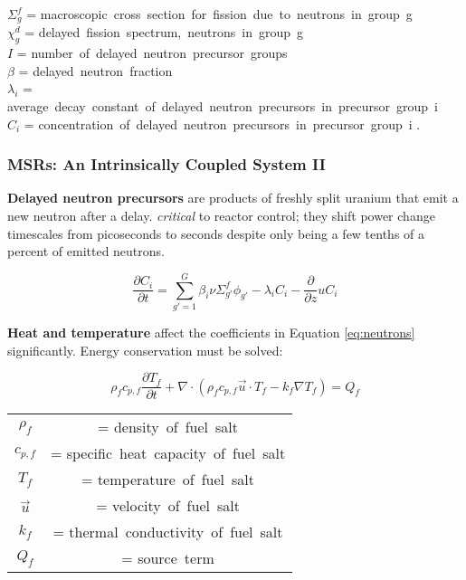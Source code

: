 \begin{frame}
				$\Sigma_g^f$ = \mbox{macroscopic cross section for fission due to neutrons in group g} \\
				$\chi_g^d$   = \mbox{delayed fission spectrum, neutrons in group g} \\
				$I $         = \mbox{number of delayed neutron precursor groups} \\
				$\beta $     = \mbox{delayed neutron fraction}\\
				$\lambda_i $ = \mbox{average decay constant of delayed neutron precursors
				in precursor group i} \\
				$C_i $       = \mbox{concentration of delayed neutron precursors in precursor
				group i} .
\end{frame}

\begin{frame}
    \frametitle{MSRs: An Intrinsically Coupled System II}
    \textbf{Delayed neutron precursors} are products of freshly split uranium that emit a new neutron after a delay.
    \textit{critical} to reactor control; they shift power change timescales from picoseconds to seconds despite
    only being a few tenths of a percent of emitted neutrons.

	\begin{equation}
			\frac{\partial C_i}{\partial t} = \sum_{g'= 1}^G \beta_i \nu
			\Sigma_{g'}^f \phi_{g'} - \lambda_i C_i - \frac{\partial}{\partial z} u
			C_i \label{eq:precursors}
	\end{equation}


    \textbf{Heat and temperature} affect the coefficients in Equation \ref{eq:neutrons} significantly. Energy conservation must be solved:

\begin{equation}
        \rho_fc_{p,f}\frac{\partial T_f}{\partial t} + \nabla\cdot\left(\rho_f
        c_{p,f} \vec{u}\cdot T_f -k_f\nabla T_f\right) =  Q_f
  \label{eq:fuel_temp}
\end{equation}

\begin{tabular}{cc}
  $\rho_f $ &= \mbox{density of fuel salt}\\
  $c_{p,f}$ &= \mbox{specific heat capacity of fuel salt}\\
  $T_f    $ &= \mbox{temperature of fuel salt}\\
  $\vec{u}$ &= \mbox{velocity of fuel salt}\\
  $k_f    $ &= \mbox{thermal conductivity of fuel salt}\\
  $Q_f    $ &= \mbox{source term}\\
\end{tabular}

\end{frame}

